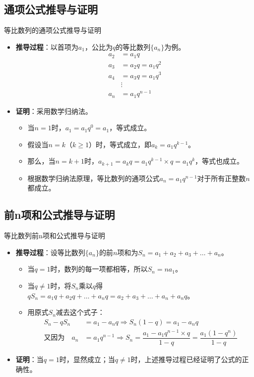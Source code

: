 \documentclass[aspectratio=169]{ctexbeamer} %
\begin{document}
\subsection{通项公式推导与证明}
\begin{frame}{等比数列的通项公式推导与证明}
\begin{itemize}
\item \textbf{推导过程}：以首项为$a_1$，公比为$q$的等比数列$\{a_n\}$为例。
\begin{align*}
a_2 &= a_1 q \\
a_3 &= a_2 q = a_1 q^2 \\
a_4 &= a_3 q = a_1 q^3 \\
&\vdots \\
a_n &= a_1 q^{n-1}
\end{align*}
\item \textbf{证明}：采用数学归纳法。
\begin{itemize}
\item 当$n = 1$时，$a_1 = a_1 q^0 = a_1$，等式成立。
\item 假设当$n = k$（$k \geq 1$）时，等式成立，即$a_k = a_1 q^{k-1}$。
\item 那么，当$n = k + 1$时，$a_{k+1} = a_k q = a_1 q^{k-1} \times q = a_1 q^k$，等式也成立。
\item 根据数学归纳法原理，等比数列的通项公式$a_n = a_1 q^{n-1}$对于所有正整数$n$都成立。
\end{itemize}
\end{itemize}
\end{frame}

\subsection{前n项和公式推导与证明}
\begin{frame}{等比数列前n项和公式推导与证明}
\begin{itemize}
\item \textbf{推导过程}：设等比数列$\{a_n\}$的前$n$项和为$S_n = a_1 + a_2 + a_3 + \dots + a_n$。
\begin{itemize}
\item 当$q = 1$时，数列的每一项都相等，所以$S_n = n a_1$。
\item 当$q \neq 1$时，将$S_n$乘以$q$得$q S_n = a_1 q + a_2 q + \dots + a_n q = a_2 + a_3 + \dots + a_n + a_n q$。
\item 用原式$S_n$减去这个式子：
\begin{align*}
S_n - q S_n &= a_1 - a_n q \Rightarrow S_n (1 - q) = a_1 - a_n q \\
\text{又因为}\quad a_n &= a_1 q^{n-1} \Rightarrow S_n = \dfrac{a_1 - a_1 q^{n-1} \times q}{1 - q} = \dfrac{a_1 (1 - q^n)}{1 - q}
\end{align*}
\end{itemize}
\item \textbf{证明}：当$q = 1$时，显然成立；当$q \neq 1$时，上述推导过程已经证明了公式的正确性。
\end{itemize}
\end{frame}
\end{document}
